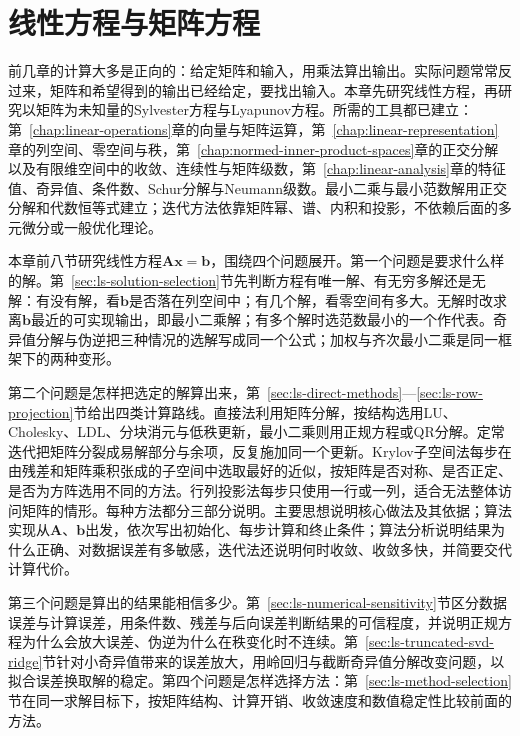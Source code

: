 \chapter{线性方程与矩阵方程}
\label{chap:linear-equations-and-optimization}
\label{sec:linear-algebra-reachability-solvability}

前几章的计算大多是正向的：给定矩阵和输入，用乘法算出输出。实际问题常常反过来，矩阵和希望得到的输出已经给定，要找出输入。本章先研究线性方程，再研究以矩阵为未知量的Sylvester方程与Lyapunov方程。所需的工具都已建立：第~\ref{chap:linear-operations}章的向量与矩阵运算，第~\ref{chap:linear-representation}章的列空间、零空间与秩，第~\ref{chap:normed-inner-product-spaces}章的正交分解以及有限维空间中的收敛、连续性与矩阵级数，第~\ref{chap:linear-analysis}章的特征值、奇异值、条件数、Schur分解与Neumann级数。最小二乘与最小范数解用正交分解和代数恒等式建立；迭代方法依靠矩阵幂、谱、内积和投影，不依赖后面的多元微分或一般优化理论。

本章前八节研究线性方程$\bm A\bm x=\bm b$，围绕四个问题展开。第一个问题是要求什么样的解。第~\ref{sec:ls-solution-selection}节先判断方程有唯一解、有无穷多解还是无解：有没有解，看$\bm b$是否落在列空间中；有几个解，看零空间有多大。无解时改求离$\bm b$最近的可实现输出，即最小二乘解；有多个解时选范数最小的一个作代表。奇异值分解与伪逆把三种情况的选解写成同一个公式；加权与齐次最小二乘是同一框架下的两种变形。

第二个问题是怎样把选定的解算出来，第~\ref{sec:ls-direct-methods}—\ref{sec:ls-row-projection}节给出四类计算路线。直接法利用矩阵分解，按结构选用LU、Cholesky、LDL、分块消元与低秩更新，最小二乘则用正规方程或QR分解。定常迭代把矩阵分裂成易解部分与余项，反复施加同一个更新。Krylov子空间法每步在由残差和矩阵乘积张成的子空间中选取最好的近似，按矩阵是否对称、是否正定、是否为方阵选用不同的方法。行列投影法每步只使用一行或一列，适合无法整体访问矩阵的情形。每种方法都分三部分说明。主要思想说明核心做法及其依据；算法实现从$\bm A$、$\bm b$出发，依次写出初始化、每步计算和终止条件；算法分析说明结果为什么正确、对数据误差有多敏感，迭代法还说明何时收敛、收敛多快，并简要交代计算代价。

第三个问题是算出的结果能相信多少。第~\ref{sec:ls-numerical-sensitivity}节区分数据误差与计算误差，用条件数、残差与后向误差判断结果的可信程度，并说明正规方程为什么会放大误差、伪逆为什么在秩变化时不连续。第~\ref{sec:ls-truncated-svd-ridge}节针对小奇异值带来的误差放大，用岭回归与截断奇异值分解改变问题，以拟合误差换取解的稳定。第四个问题是怎样选择方法：第~\ref{sec:ls-method-selection}节在同一求解目标下，按矩阵结构、计算开销、收敛速度和数值稳定性比较前面的方法。

